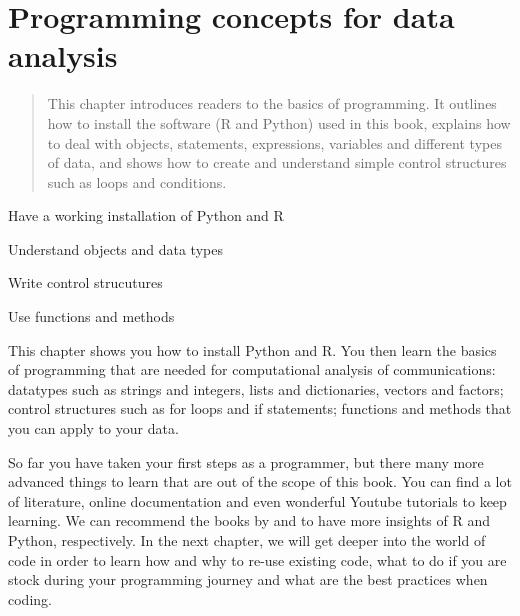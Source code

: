 \chapter{Programming concepts for data analysis}
\label{chap:programmingconcepts}

\begin{abstract}
This chapter introduces readers to the basics of programming. It
outlines how to install the software (R and Python) used in this book,
explains how to deal with objects, statements, expressions, variables
and different types of data, and shows how to create and understand
simple control structures such as loops and conditions.
\end{abstract}


\begin{objectives}
\item Have a working installation of Python and R
\item Understand objects and data types
\item Write control strucutures
\item Use functions and methods
\end{objectives}

\begin{feature}
This chapter shows you how to install Python and R. You then learn the
basics of programming that are needed for computational analysis of
communications: datatypes such as strings and integers, lists and
dictionaries, vectors and factors; control structures such as for
loops and if statements; functions and methods that you can apply to
your data.

\end{feature}










So far you have taken your first steps as a programmer, but there many
more advanced things to learn that are out of the scope of this
book. You can find a lot of literature, online documentation and even
wonderful Youtube tutorials to keep learning. We can recommend the
books by \cite{crawley2012r} and \cite{vanderplas2016python} to have
more insights of R and Python, respectively. In the next chapter, we
will get deeper into the world of code in order to learn how and why
to re-use existing code, what to do if you are stock during your
programming journey and what are the best practices when coding.
